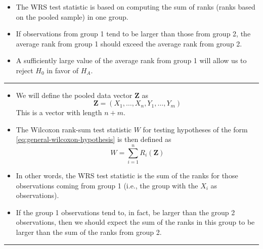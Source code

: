 \documentclass[]{book}
\begin{document}
\begin{itemize}
\item
  The WRS test statistic is based on computing the sum of ranks (ranks based on the pooled sample)
  in one group.
\item
  If observations from group 1 tend to be larger than those from group 2, the average rank from group 1 should exceed the
  average rank from group 2.
\item
  A sufficiently large value of the average rank from group 1 will allow us to reject \(H_{0}\)
  in favor of \(H_{A}\).
\end{itemize}

\begin{center}\rule{0.5\linewidth}{\linethickness}\end{center}

\begin{itemize}
\item
  We will define the pooled data vector \(\mathbf{Z}\) as
  \begin{equation}
  \mathbf{Z} = (X_{1}, \ldots, X_{n}, Y_{1}, \ldots, Y_{m})
  \end{equation}
  This is a vector with length \(n + m\).
\item
  The Wilcoxon rank-sum test statistic \(W\) for testing hypotheses of the form \eqref{eq:general-wilcoxon-hypothesis}
  is then defined as
  \begin{equation}
  W = \sum_{i=1}^{n} R_{i}( \mathbf{Z} )
  \label{eq:wrs-formula}
  \end{equation}
\item
  In other words, the WRS test statistic is the sum of the ranks for those observations coming
  from group 1 (i.e., the group with the \(X_{i}\) as observations).
\item
  If the group 1 observations tend to, in fact, be larger than the group 2 observations,
  then we should expect the sum of the ranks in this group to be larger than the sum of the
  ranks from group 2.
\end{itemize}

\begin{center}\rule{0.5\linewidth}{\linethickness}\end{center}
\end{document}
